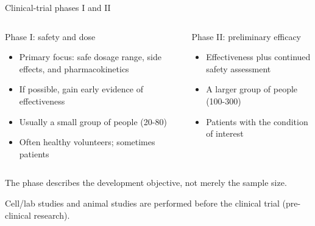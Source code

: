 \documentclass[aspectratio=169,11pt]{beamer}
\begin{document}
\begin{frame}{Clinical-trial phases I and II}
  \begin{columns}[T]
      \begin{block}{Phase I: safety and dose}
        \begin{itemize}
          \item Primary focus: safe dosage range, side effects, and pharmacokinetics
          \item If possible, gain early evidence of effectiveness
          \item Usually a small group of people (20-80)
          \item Often healthy volunteers; sometimes patients
        \end{itemize}
      \end{block}
      \begin{block}{Phase II: preliminary efficacy}
        \begin{itemize}
          \item Effectiveness plus continued safety assessment
          \item A larger group of people (100-300)
          \item Patients with the condition of interest
        \end{itemize}
      \end{block}
  \end{columns}
  \vfill
  \alert{The phase describes the development objective, not merely the sample size.}

  Cell/lab studies and animal studies are performed before the clinical trial (pre-clinical research).

\end{frame}
\end{document}
